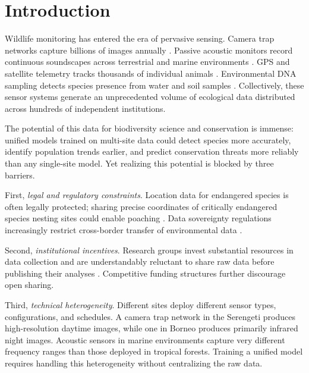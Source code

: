 \documentclass[11pt,a4paper]{article}
\begin{document}
\section{Introduction}
\label{sec:introduction}

Wildlife monitoring has entered the era of pervasive sensing.
Camera trap networks capture billions of images annually \citep{ahumada2020wildlife}.
Passive acoustic monitors record continuous soundscapes across terrestrial and marine environments \citep{gibb2019emerging}.
GPS and satellite telemetry tracks thousands of individual animals \citep{kays2015terrestrial}.
Environmental DNA sampling detects species presence from water and soil samples \citep{deiner2017environmental}.
Collectively, these sensor systems generate an unprecedented volume of ecological data distributed across hundreds of independent institutions.

The potential of this data for biodiversity science and conservation is immense: unified models trained on multi-site data could detect species more accurately, identify population trends earlier, and predict conservation threats more reliably than any single-site model.
Yet realizing this potential is blocked by three barriers.

First, \emph{legal and regulatory constraints}.
Location data for endangered species is often legally protected; sharing precise coordinates of critically endangered species nesting sites could enable poaching \citep{lindenmayer2017do}.
Data sovereignty regulations increasingly restrict cross-border transfer of environmental data \citep{fritz2019citizen}.

Second, \emph{institutional incentives}.
Research groups invest substantial resources in data collection and are understandably reluctant to share raw data before publishing their analyses \citep{tenopir2011data}.
Competitive funding structures further discourage open sharing.

Third, \emph{technical heterogeneity}.
Different sites deploy different sensor types, configurations, and schedules.
A camera trap network in the Serengeti produces high-resolution daytime images, while one in Borneo produces primarily infrared night images.
Acoustic sensors in marine environments capture very different frequency ranges than those deployed in tropical forests.
Training a unified model requires handling this heterogeneity without centralizing the raw data.
\end{document}
